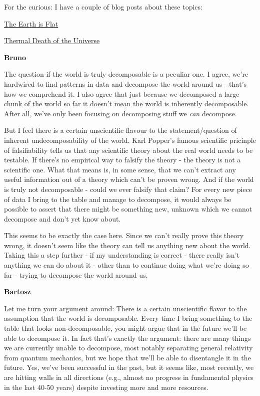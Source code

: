\documentclass{amsart}
\newcommand{\respond}[1]{
  \vspace{1em} \textbf{#1}
}
\begin{document}
For the curious: I have a couple of blog posts about these topics:

\href{https://bartoszmilewski.com/2018/01/11/the-earth-is-flat/}{The Earth is Flat}

\href{https://bartoszmilewski.com/2018/03/28/life-and-thermal-death-in-the-universe/}{Thermal Death of the Universe}

\respond{Bruno}
The question if the world is truly decomposable is a peculiar one. I agree,
we're hardwired to find patterns in data and decompose the world around us -
that's how we comprehend it. I also agree that just because we decomposed a
large chunk of the world so far it doesn't mean the world is inherently
decomposable. After all, we've only been focusing on decomposing stuff we
\textit{can} decompose.

But I feel there is a certain unscientific flavour to the statement/question of
inherent undecomposability of the world. Karl Popper's famous scientific
pricinple of falsifiability tells us that any scientific theory about the real
world needs to be testable. If there's no empirical way to falsify the theory -
the theory is not a scientific one. What that means is, in some sense, that we
can't extract any useful information out of a theory which can't be proven
wrong. And if the world is truly not decomposable - could we ever falsify that
claim? For every new piece of data I bring to the table and manage to decompose,
it would always be possible to assert that there might be something new, unknown
which we cannot decompose and don't yet know about.

This seems to be exactly the case here. Since we can't really prove this theory wrong, it doesn't seem like the theory can tell us anything new about the world.
Taking this a step further - if my understanding is correct - there really isn't anything we can do about it - other than to continue doing what we're doing so far - trying to decompose the world around us.

\respond{Bartosz}

Let me turn your argument around: There is a certain unscientific flavor to the
assumption that the world is decomposable. Every time I bring something to the
table that looks non-decomposable, you might argue that in the future we'll be
able to decompose it. In fact that's exactly the argument: there are many things
we are currently unable to decompose, most notably separating general relativity
from quantum mechanics, but we hope that we'll be able to disentangle it in the
future. Yes, we've been successful in the past, but it seems like, most
recently, we are hitting walls in all directions (e.g., almost no progress in
fundamental physics in the last 40-50 years) despite investing more and more
resources.
\end{document}

